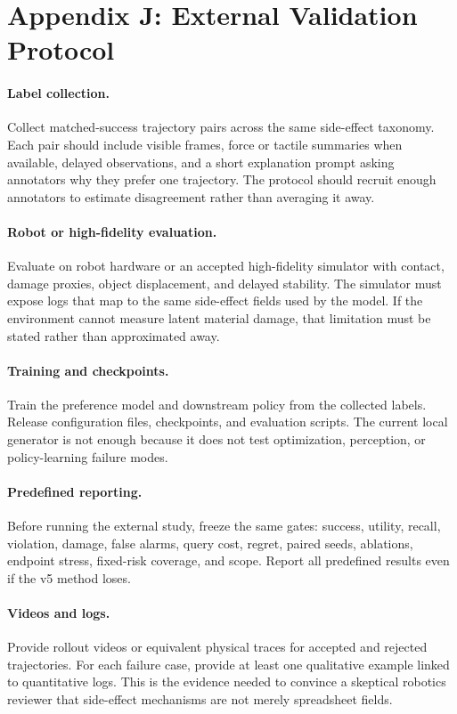 \documentclass{article}
\begin{document}
\clearpage
\section*{Appendix J: External Validation Protocol}
\paragraph{Label collection.}
Collect matched-success trajectory pairs across the same side-effect taxonomy. Each pair should include visible frames, force or tactile summaries when available, delayed observations, and a short explanation prompt asking annotators why they prefer one trajectory. The protocol should recruit enough annotators to estimate disagreement rather than averaging it away.

\paragraph{Robot or high-fidelity evaluation.}
Evaluate on robot hardware or an accepted high-fidelity simulator with contact, damage proxies, object displacement, and delayed stability. The simulator must expose logs that map to the same side-effect fields used by the model. If the environment cannot measure latent material damage, that limitation must be stated rather than approximated away.

\paragraph{Training and checkpoints.}
Train the preference model and downstream policy from the collected labels. Release configuration files, checkpoints, and evaluation scripts. The current local generator is not enough because it does not test optimization, perception, or policy-learning failure modes.

\paragraph{Predefined reporting.}
Before running the external study, freeze the same gates: success, utility, recall, violation, damage, false alarms, query cost, regret, paired seeds, ablations, endpoint stress, fixed-risk coverage, and scope. Report all predefined results even if the v5 method loses.

\paragraph{Videos and logs.}
Provide rollout videos or equivalent physical traces for accepted and rejected trajectories. For each failure case, provide at least one qualitative example linked to quantitative logs. This is the evidence needed to convince a skeptical robotics reviewer that side-effect mechanisms are not merely spreadsheet fields.
\end{document}
